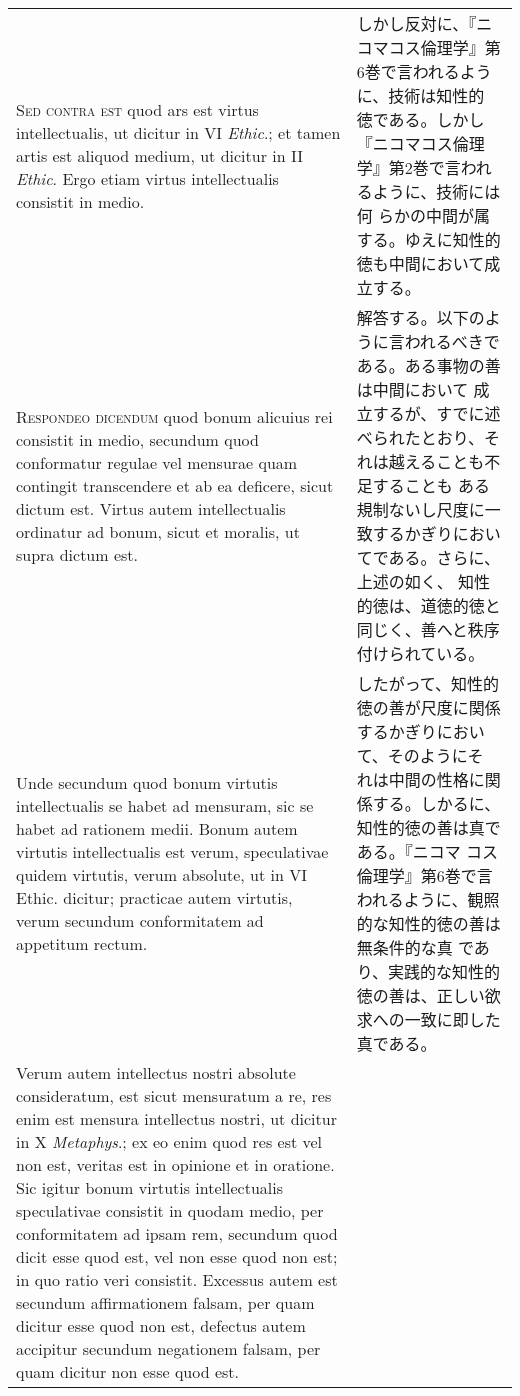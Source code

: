 \documentclass[10pt]{jsarticle}
\begin{document}
\begin{longtable}{p{21em}p{21em}}
\\




{\scshape Sed contra est} quod ars est virtus intellectualis, ut
dicitur in VI {\itshape Ethic}.; et tamen artis est aliquod medium, ut
dicitur in II {\itshape Ethic}. Ergo etiam virtus intellectualis
consistit in medio.


&

 しかし反対に、『ニコマコス倫理学』第6巻で言われるように、技術は知性的
 徳である。しかし『ニコマコス倫理学』第2巻で言われるように、技術には何
 らかの中間が属する。ゆえに知性的徳も中間において成立する。

\\




{\scshape Respondeo dicendum} quod bonum alicuius rei consistit in
medio, secundum quod conformatur regulae vel mensurae quam contingit
transcendere et ab ea deficere, sicut dictum est. Virtus autem
intellectualis ordinatur ad bonum, sicut et moralis, ut supra dictum
est.

 
&

 解答する。以下のように言われるべきである。ある事物の善は中間において
 成立するが、すでに述べられたとおり、それは越えることも不足することも
 ある規制ないし尺度に一致するかぎりにおいてである。さらに、上述の如く、
 知性的徳は、道徳的徳と同じく、善へと秩序付けられている。

\\


 Unde secundum quod bonum virtutis intellectualis se habet ad
 mensuram, sic se habet ad rationem medii. Bonum autem virtutis
 intellectualis est verum, speculativae quidem virtutis, verum
 absolute, ut in VI Ethic. dicitur; practicae autem virtutis, verum
 secundum conformitatem ad appetitum rectum.


&

 したがって、知性的徳の善が尺度に関係するかぎりにおいて、そのようにそ
 れは中間の性格に関係する。しかるに、知性的徳の善は真である。『ニコマ
 コス倫理学』第6巻で言われるように、観照的な知性的徳の善は無条件的な真
 であり、実践的な知性的徳の善は、正しい欲求への一致に即した真である。

\\


 Verum autem intellectus nostri absolute consideratum, est sicut
 mensuratum a re, res enim est mensura intellectus nostri, ut dicitur
 in X {\itshape Metaphys}.; ex eo enim quod res est vel non est,
 veritas est in opinione et in oratione. Sic igitur bonum virtutis
 intellectualis speculativae consistit in quodam medio, per
 conformitatem ad ipsam rem, secundum quod dicit esse quod est, vel
 non esse quod non est; in quo ratio veri consistit. Excessus autem
 est secundum affirmationem falsam, per quam dicitur esse quod non
 est, defectus autem accipitur secundum negationem falsam, per quam
 dicitur non esse quod est.


\end{longtable}
\end{document}
